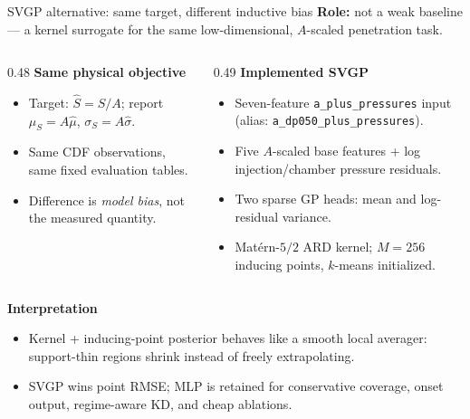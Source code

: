 \documentclass[aspectratio=169,11pt]{beamer}
\begin{document}
\begin{frame}{SVGP alternative: same target, different inductive bias}
\footnotesize
\textbf{Role:} not a weak baseline --- a kernel surrogate for the same
low-dimensional, $A$-scaled penetration task.

\vspace{0.45em}
\begin{columns}[T,onlytextwidth]
\begin{column}{0.48\linewidth}
\textbf{Same physical objective}
\begin{itemize}\setlength\itemsep{2pt}
  \item Target: $\hat S=S/A$; report $\mu_S=A\hat\mu$, $\sigma_S=A\hat\sigma$.
  \item Same CDF observations, same fixed evaluation tables.
  \item Difference is \emph{model bias}, not the measured quantity.
\end{itemize}
\end{column}
\begin{column}{0.49\linewidth}
\textbf{Implemented SVGP}
\begin{itemize}\setlength\itemsep{2pt}
  \item Seven-feature \texttt{a\_plus\_pressures} input
        (alias: \texttt{a\_dp050\_plus\_pressures}).
  \item Five $A$-scaled base features + log injection/chamber pressure residuals.
  \item Two sparse GP heads: mean and log-residual variance.
  \item Mat\'ern-$5/2$ ARD kernel; $M{=}256$ inducing points, $k$-means initialized.
\end{itemize}
\end{column}
\end{columns}

\vspace{0.15em}
\textbf{Interpretation}
\begin{itemize}\setlength\itemsep{1pt}
  \item Kernel + inducing-point posterior behaves like a smooth local averager:
        support-thin regions shrink instead of freely extrapolating.
  \item SVGP wins point RMSE; MLP is retained for conservative coverage,
        onset output, regime-aware KD, and cheap ablations.
\end{itemize}
\end{frame}
\end{document}
